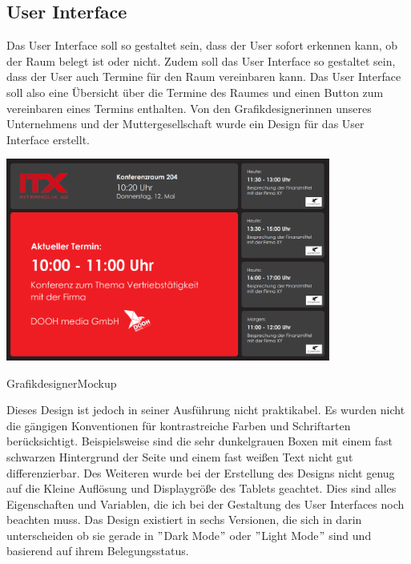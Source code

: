 \subsection{User Interface}
Das User Interface soll so gestaltet sein, dass der User sofort erkennen kann, ob der Raum belegt ist oder nicht. Zudem soll das User Interface so gestaltet sein, dass der User auch Termine für den Raum vereinbaren kann. Das User Interface soll also eine Übersicht über die Termine des Raumes und einen Button zum vereinbaren eines Termins enthalten.
\newline
Von den Grafikdesignerinnen unseres Unternehmens und der Muttergesellschaft wurde ein Design für das User Interface erstellt.
\newline
\newline
\par\vspace{1cm}
\centering
\includegraphics[width=0.8\textwidth]{Bilder/GrafikdesignerMockup}
\caption{GrafikdesignerMockup}
\label{fig:GrafikdesignerMockup}
\par\vspace{1cm}
\raggedright
Dieses Design ist jedoch in seiner Ausführung nicht praktikabel.
Es wurden nicht die gängigen Konventionen für kontrastreiche Farben und Schriftarten berücksichtigt.
Beispielsweise sind die sehr dunkelgrauen Boxen mit einem fast schwarzen Hintergrund der Seite und einem fast weißen Text nicht gut differenzierbar.
Des Weiteren wurde bei der Erstellung des Designs nicht genug auf die Kleine Auflösung und Displaygröße des Tablets geachtet.
Dies sind alles Eigenschaften und Variablen, die ich bei der Gestaltung des User Interfaces noch beachten muss.
\newline
Das Design existiert in sechs Versionen, die sich in darin unterscheiden ob sie gerade in \("\)Dark Mode\("\) oder \("\)Light Mode\("\) sind und basierend auf ihrem Belegungsstatus.
